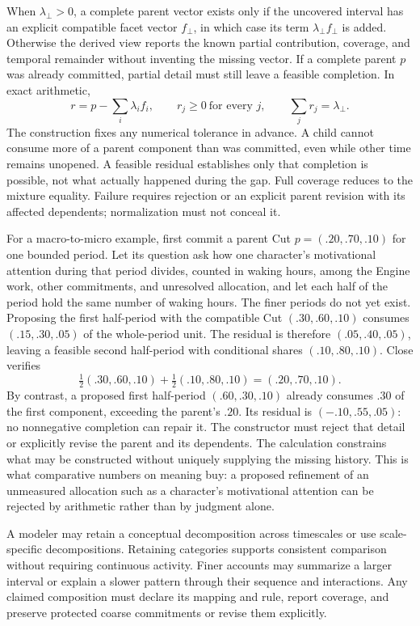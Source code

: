 \documentclass[11pt,a4paper]{article}
\begin{document}
When $\lambda_\bot>0$, a complete parent vector exists only if the uncovered
interval has an explicit compatible facet vector $f_\bot$, in which case its
term $\lambda_\bot f_\bot$ is added. Otherwise the derived view reports the
known partial contribution, coverage, and temporal remainder without inventing
the missing vector. If a complete parent $p$ was already committed, partial
detail must still leave a feasible completion. In exact arithmetic,
\begin{equation}
 r=p-\sum_i\lambda_i f_i,\qquad r_j\geq0\ \text{for every }j,
 \qquad \sum_j r_j=\lambda_\bot.
 \label{eq:residual-feasibility-theory}
\end{equation}
The construction fixes any numerical tolerance in advance. A child cannot
consume more of a parent component than was committed, even while other time
remains unopened. A feasible residual establishes only that completion is
possible, not what actually happened during the gap. Full coverage reduces to
the mixture equality. Failure requires rejection or an explicit parent revision
with its affected dependents; normalization must not conceal it.

For a macro-to-micro example, first commit a parent Cut
$p=(.20,.70,.10)$ for one bounded period. Let its question ask how one
character's motivational attention during that period divides, counted in
waking hours, among the Engine work, other commitments, and unresolved
allocation, and let each half of the period hold the same number of waking
hours.
The finer periods do not yet exist. Proposing the first half-period with the
compatible Cut $(.30,.60,.10)$ consumes $(.15,.30,.05)$ of the whole-period
unit. The residual is therefore $(.05,.40,.05)$, leaving a feasible second
half-period with conditional shares $(.10,.80,.10)$. Close verifies
\[
 \tfrac12(.30,.60,.10)+\tfrac12(.10,.80,.10)=(.20,.70,.10).
\]
By contrast, a proposed first half-period $(.60,.30,.10)$ already consumes
$.30$ of the first component, exceeding the parent's $.20$. Its residual is
$(-.10,.55,.05)$: no nonnegative completion can repair it. The constructor must
reject that detail or explicitly revise the parent and its dependents. The
calculation constrains what may be constructed without uniquely supplying the
missing history. This is
what comparative numbers on meaning buy: a proposed refinement of an unmeasured
allocation such as a character's motivational attention can be rejected by arithmetic rather than by judgment
alone.

A modeler may retain a conceptual decomposition across timescales or use
scale-specific decompositions. Retaining categories supports consistent
comparison without requiring continuous activity. Finer accounts may summarize
a larger interval or explain a slower pattern through their sequence and
interactions. Any claimed composition must declare its mapping and rule, report
coverage, and preserve protected coarse commitments or revise them explicitly.
\end{document}
